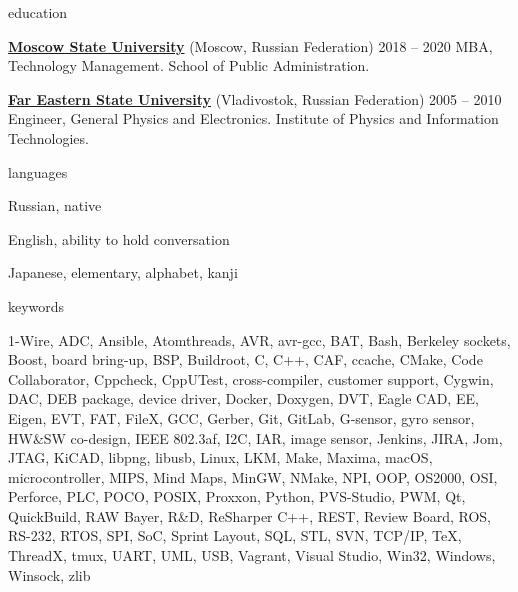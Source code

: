 \documentclass{template}
\begin{document}
\begin{rSection}{education}

{\bf \href{https://www.msu.ru/en/}{Moscow State University}} (Moscow, Russian Federation) \hfill {2018 -- 2020} \newline
MBA, Technology Management. School of Public Administration.

{\bf \href{https://www.dvfu.ru/en/}{Far Eastern State University}} (Vladivostok, Russian Federation) \hfill {2005 -- 2010} \newline
Engineer, General Physics and Electronics. Institute of Physics and Information Technologies.

\end{rSection}

\begin{rSection}{languages}
\begin{rItemize}

\item Russian, native
\item English, ability to hold conversation
\item Japanese, elementary, alphabet, kanji

\end{rItemize}
\end{rSection}

\begin{rSection}{keywords}

1-Wire, ADC, Ansible, Atomthreads, AVR, avr-gcc, BAT, Bash, Berkeley sockets, Boost, board bring-up, BSP, Buildroot, C, C++, CAF, ccache, CMake,
Code Collaborator, Cppcheck, CppUTest, cross-compiler, customer support, Cygwin, DAC, DEB package, device driver, Docker, Doxygen, DVT, Eagle CAD,
EE, Eigen, EVT, FAT, FileX, GCC, Gerber, Git, GitLab, G-sensor, gyro sensor, HW\&SW co-design, IEEE 802.3af, I2C, IAR, image sensor, Jenkins, JIRA,
Jom, JTAG, KiCAD, libpng, libusb, Linux, LKM, Make, Maxima, macOS, microcontroller, MIPS, Mind Maps, MinGW, NMake, NPI, OOP, OS2000, OSI, Perforce,
PLC, POCO, POSIX, Proxxon, Python, PVS-Studio, PWM, Qt, QuickBuild, RAW Bayer, R\&D, ReSharper C++, REST, Review Board, ROS, RS-232, RTOS, SPI, SoC,
Sprint Layout, SQL, STL, SVN, TCP/IP, TeX, ThreadX, tmux, UART, UML, USB, Vagrant, Visual Studio, Win32, Windows, Winsock, zlib

\end{rSection}
\end{document}
